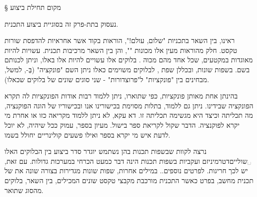 § מקום תחילת ביצוע

נעסוק בתת-פרק זה בסוגיית  ביצוע התכנית.

ראינו, בין השאר בתכניות "שלום, עולם!", הוראות בקוד אשר אחראיות להדפסת שורות טקסט. חלק מהוראות מעין אלו מכונות "", והן בין השאר מרכיבות תכנית.  עשויות להיות מאוגדות במקטעים, שכל אחד מהם מכוה . בלוקים אלו עשויים להיות  אלו באלו, וניתן לכנותם בשם. בשפות שונות, ובכללן שפת , לבלוקים משוימים כאלו ניתן השם "פונקציה" (בְּ-, למשל, מבחינים בין "פונקציות" ל"פרוצדורות" - שני סוגים שונים של בלוקים שכאלו).

בהינתן אחת מאותן פונקציות, כפי שתוארו, ניתן ללמוד רבות אודות הפונקציות לה תקרא הפונקציה שבידינו. ניתן גם ללמוד, בתלות מסוימת בכישורינו אנו ובכישוריו של הוגה הפוקנציה, מה תכליתה וכיצד היא מגשימה תכליתה זו. דא עקא, לא ניתן ללמוד מקריאה כזו או אחרת מי יקרא לפוקנציה. הדבר שקול לקריאת ספר בישול. מעיון בספר, עמוק ככל שיהיה, לא יוכל לדעת איש מי יקרא בספר ואילו פשעים קולינריים יחולל בשמו.

נרצה לקוות שבשפות תכנות בהן נשתמש יוגדר סדר ביצוע בין הבלוקים האלו ␣שוליים{דטרמיניזם ועקביות בשפות תכנות הינה דבר כמעט הכרחי במערכות גדולות. עם זאת, יש לכך חריגות. לפרטים נוספים.}. במילים אחרות, שפות שונות מגדירות בצורה שונה את  של תכנית מחשב, בפרט כאשר התכנית מורכבת מקבצי טקסט שונים המכילים, בין השאר, בלוקים מהסוג שתואר.

